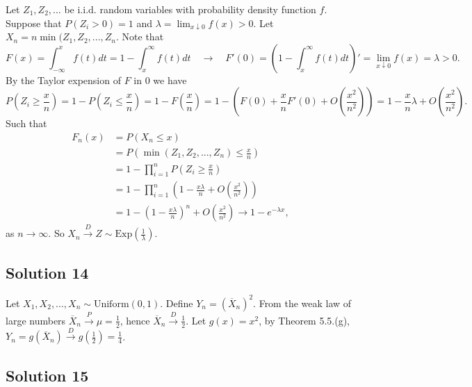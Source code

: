 Let $Z_1, Z_2, ...$ be i.i.d. random variables with probability density function $f$.
Suppose that $P(Z_i > 0) = 1$ and $\lambda = \lim_{x \downarrow 0} f(x) > 0$.
Let $X_n = n \min(Z_1, Z_2, ..., Z_n$.
Note that
\begin{equation*}
    F(x) = \int_{-\infty}^{x} f(t) dt
        = 1 - \int_{x}^{\infty} f(t) dt
        \quad \rightarrow \quad
    F'(0) = \left( 1 - \int_{x}^{\infty} f(t) dt \right)'
        = \lim_{x \downarrow 0} f(x)
        = \lambda > 0.
\end{equation*}
By the Taylor expension of $F$ in $0$ we have
\begin{equation*}
    P(Z_i \geq \frac{x}{n}) = 1 - P(Z_i \leq \frac{x}{n})
        = 1 - F(\frac{x}{n})
        = 1 - (F(0) + \frac{x}{n} F'(0) + O(\frac{x^2}{n^2}))
        = 1 - \frac{x}{n} \lambda + O(\frac{x^2}{n^2}).
\end{equation*}
Such that
\begin{equation*}
    \begin{split}
        F_n(x)
            &= P\left(X_n \leq x\right) \\
            &= P\left(\min(Z_1, Z_2, ..., Z_n) \leq \frac{x}{n}\right) \\
            &= 1 - \prod_{i = 1}^n P\left(Z_i \geq \frac{x}{n}\right) \\
            &= 1 - \prod_{i = 1}^n \left(1 - \frac{x \lambda}{n} + O(\frac{x^2}{n^2})\right) \\
            &= 1 - \left(1 - \frac{x \lambda}{n}\right)^n + O\left(\frac{x^2}{n^2}\right)
            \to 1 - e^{-\lambda x},
    \end{split}
\end{equation*}
as $n \to \infty$.
So $X_n \xrightarrow{D} Z \sim \mathrm{Exp}(\frac{1}{\lambda})$.


\subsection*{Solution 14}

Let $X_1, X_2, ..., X_n \sim \mathrm{Uniform}(0, 1)$.
Define $Y_n = (\overline{X}_n)^2$.
From the weak law of large numbers $\overline{X}_n \xrightarrow{P} \mu = \frac{1}{2}$, hence $\overline{X}_n \xrightarrow{D} \frac{1}{2}$.
Let $g(x) = x^2$, by Theorem 5.5.(g), $Y_n = g(\overline{X}_n) \xrightarrow{D} g(\frac{1}{2}) = \frac{1}{4}$.


\subsection*{Solution 15}

